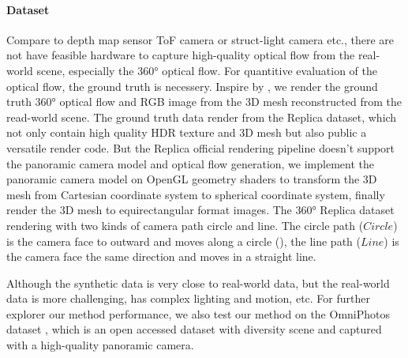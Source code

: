 \paragraph{Dataset}
%
%
%
Compare to depth map sensor ToF camera or struct-light camera etc., 
there are not have feasible hardware to capture high-quality optical flow from the real-world scene, especially the 360° optical flow.
%
For quantitive evaluation of the optical flow, the ground truth is necessery.
Inspire by \cite{shugrina2019creative}, we render the ground truth 360° optical flow and RGB image from the 3D mesh reconstructed from the read-world scene.
The ground truth data render from the Replica dataset\cite{StrauWMCWGEMRVCYBYPYZLCBGMPSBSNGLN2019}, which not only contain high quality HDR texture and 3D mesh but also public a versatile render code.
But the Replica official rendering pipeline doesn't support the panoramic camera model and optical flow generation, we implement the panoramic camera model on OpenGL geometry shaders to transform the 3D mesh from Cartesian coordinate system to spherical coordinate system, finally render the 3D mesh to equirectangular format images.
The 360° Replica dataset rendering with two kinds of camera path circle and line. The circle path ($Circle$) is the camera face to outward and moves along a circle (), the line path ($Line$) is the camera face the same direction and moves in a straight line.

Although the synthetic data is very close to real-world data, but the real-world data is more challenging, has complex lighting and motion, etc. 
%
For further explorer our method performance, we also test our method on the OmniPhotos dataset \cite{BerteYLR2020}, which is an open accessed dataset with diversity scene and captured with a high-quality panoramic camera.

